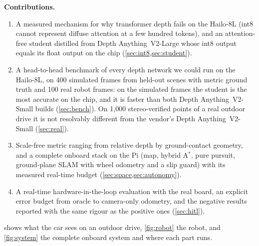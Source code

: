 \documentclass[conference]{IEEEtran}
\newcommand{\hailo}{Hailo-8L}
\newcommand{\dav}{Depth Anything~V2}
\newcommand{\keyline}[1]{\smallskip\noindent\textbf{#1}\ }
\begin{document}
\keyline{Contributions.}
\begin{enumerate}
  \item A measured mechanism for why transformer depth fails on the \hailo{} (int8 cannot represent diffuse attention
  at a few hundred tokens), and an attention-free student distilled from \dav-Large whose int8 output equals its float
  output on the chip (\cref{sec:int8,sec:student}).
  \item A head-to-head benchmark of every depth network we could run on the \hailo{}, on 400 simulated frames from held-out
  scenes with metric ground truth and 100 real robot frames: on the simulated frames the student is the most accurate on the chip, and it
  is faster than both \dav-Small builds (\cref{sec:bench}). On 1{,}000 stereo-verified points of a real outdoor drive it is
  not resolvably different from the vendor's \dav-Small (\cref{sec:real}).
  \item Scale-free metric ranging from relative depth by ground-contact geometry, and a complete onboard stack on the Pi
  (map, hybrid A$^\ast$, pure pursuit, ground-plane SLAM with wheel odometry and a slip guard) with its measured real-time
  budget (\cref{sec:space,sec:autonomy}).
  \item A real-time hardware-in-the-loop evaluation with the real board, an explicit error budget from oracle to
  camera-only odometry, and the negative results reported with the same rigour as the positive ones (\cref{sec:hitl}).
\end{enumerate}

 shows what the car sees on an outdoor drive, \cref{fig:robot} the robot, and \cref{fig:system} the
complete onboard system and where each part runs.
\end{document}
